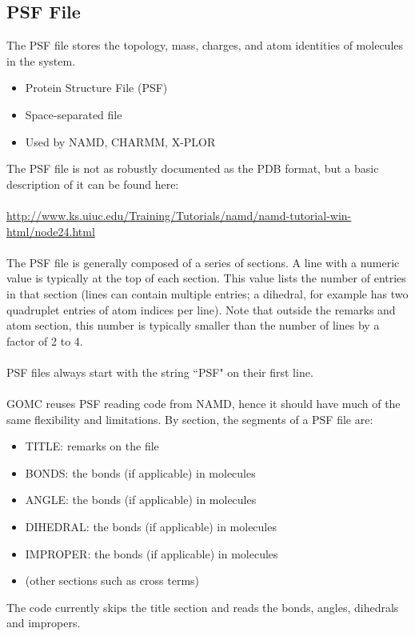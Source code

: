 \subsection{PSF File}
The PSF file stores the topology, mass, charges, and atom identities of molecules in the system.
\begin{itemize}
\item Protein Structure File (PSF) 
\item Space-separated file
\item Used by NAMD, CHARMM, X-PLOR
\end{itemize}
The PSF file is not as robustly documented as the PDB format, but a basic description of it can be found here:\\\\
\url{http://www.ks.uiuc.edu/Training/Tutorials/namd/namd-tutorial-win-html/node24.html}\\\\
The PSF file is generally composed of a series of sections. A line with a numeric value is typically at the top of each section. This value lists the number of entries in that section (lines can contain multiple entries; a dihedral, for example has two quadruplet entries of atom indices per line). Note that outside the remarks and atom section, this number is typically smaller than the number of lines by a factor of 2 to 4.\\\\
PSF files always start with the string ``PSF" on their first line.\\\\
GOMC reuses PSF reading code from NAMD, hence it should have much of the same flexibility and limitations.  By section, the segments of a PSF file are:
\begin{itemize}
\item TITLE: remarks on the file
\item BONDS: the bonds (if applicable) in molecules 
\item ANGLE: the bonds (if applicable) in molecules
\item DIHEDRAL: the bonds (if applicable) in molecules
\item IMPROPER: the bonds (if applicable) in molecules
\item (other sections such as cross terms)
\end{itemize}
The code currently skips the title section and reads the bonds, angles, dihedrals and impropers.\\\\

